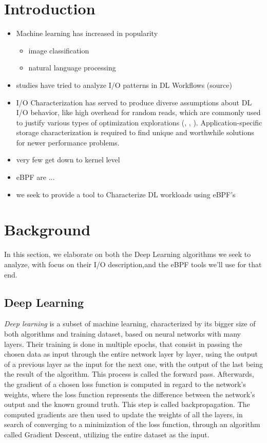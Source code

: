 \documentclass[conference]{IEEEtran}
\begin{document}
\section{Introduction}
\begin{itemize}
    \item Machine learning has increased in popularity
    \begin{itemize}
        \item image classification
        \item natural language processing
    \end{itemize}
    \item studies have tried to analyze I/O patterns in DL Workflows (source)
    \item I/O Characterization has served to produce diverse assumptions about DL I/O behavior, like high overhead for random reads, which are commonly used to justify various types of optimization explorations (\cite{LMDB}, \cite{nvme}, \cite{10.1145/3337821.3337902}). Application-specific storage characterization is required to find unique and worthwhile solutions for newer performance problems.
    \item very few get down to kernel level
    \item eBPF are ...
    \item we seek to provide a tool to Characterize DL workloads using eBPF's
\end{itemize}

\section{Background}

    In this section, we elaborate on both the Deep Learning algorithms we seek to analyze, with focus on their I/O description,and the eBPF tools we'll use for that end.

    \subsection{Deep Learning}

    \textit{Deep learning} is a subset of machine learning, characterized by its bigger size of both algorithms and training dataset, based on neural networks with many layers. Their training is done in multiple epochs, that consist in passing the chosen data as input through the entire network layer by layer, using the output of a previous layer as the input for the next one, with the output of the last being the result of the algorithm. This process is called the forward pass. Afterwards, the gradient of a chosen loss function is computed in regard to the network's weights, where the loss function represents the difference between the network's output and the known ground truth. This step is called backpropagation. The computed gradients are then used to update the weights of all the layers, in search of converging to a minimization of the loss function, through an algorithm called Gradient Descent, utilizing the entire dataset as the input. \cite{gradient}
    
\end{document}
